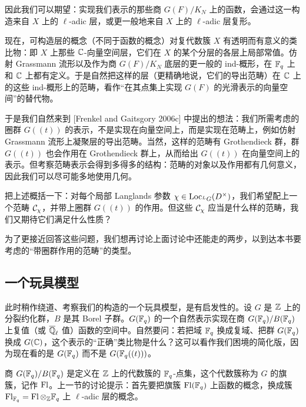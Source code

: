 因此我们可以期望：实现我们表示的那些商 $G(F)/K_N$ 上的函数，会通过这一构造来自 $X$ 上的 $\ell$-adic 层，或更一般地来自 $X$ 上的 $\ell$-adic 层复形。

现在，可构造层的概念（不同于函数的概念）对复代数簇 $X$ 有透明而有意义的类比物：即 $X$ 上那些 $\mathbb{C}$-向量空间层，它们在 $X$ 的某个分层的各层上局部常值。仿射 Grassmann 流形以及作为商 $G(F)/K_N$ 底层的更一般的 ind-概形，在 $\mathbb{F}_q$ 上和 $\mathbb{C}$ 上都有定义。于是自然把这样的层（更精确地说，它们的导出范畴）在 $\mathbb{C}$ 上的这些 ind-概形上的范畴，看作“在其点集上实现 $G(F)$ 的光滑表示的向量空间”的替代物。

于是我们自然来到 [Frenkel and Gaitsgory 2006c] 中提出的想法：我们所需考虑的圈群 $G((t))$ 的表示，不是实现在向量空间上，而是实现在范畴上，例如仿射 Grassmann 流形上凝聚层的导出范畴。当然，这样的范畴有 Grothendieck 群，群 $G((t))$ 也会作用在 Grothendieck 群上，从而给出 $G((t))$ 在向量空间上的表示。但考察范畴表示会得到多得多的结构：范畴的对象以及作用都有几何意义，因此我们可以尽可能多地使用几何。

把上述概括一下：对每个局部 Langlands 参数 $\chi\in\operatorname{Loc}_{{}^L G}(D^\times)$，我们希望配上一个范畴 $\mathcal{C}_\chi$，并带上圈群 $G((t))$ 的作用。但这些 $\mathcal{C}_\chi$ 应当是什么样的范畴，我们又期待它们满足什么性质？

为了更接近回答这些问题，我们想再讨论上面讨论中还能走的两步，以到达本书要考虑的“带圈群作用的范畴”的类型。

\subsection{一个玩具模型}

此时稍作绕道、考察我们的构造的一个玩具模型，是有启发性的。设 $G$ 是 $\mathbb{Z}$ 上的分裂约化群，$B$ 是其 Borel 子群。$G(\mathbb{F}_q)$ 的一个自然表示实现在商 $G(\mathbb{F}_q)/B(\mathbb{F}_q)$ 上复值（或 $\overline{\mathbb{Q}}_\ell$ 值）函数的空间中。自然要问：若把域 $\mathbb{F}_q$ 换成复域、把群 $G(\mathbb{F}_q)$ 换成 $G(\mathbb{C})$，这个表示的“正确”类比物是什么？这可以看作我们困境的简化版，因为现在看的是 $G(\mathbb{F}_q)$ 而不是 $G(\mathbb{F}_q((t)))$。

商 $G(\mathbb{F}_q)/B(\mathbb{F}_q)$ 是定义在 $\mathbb{Z}$ 上的代数簇的 $\mathbb{F}_q$-点集，这个代数簇称为 $G$ 的旗簇，记作 $\operatorname{Fl}$。上一节的讨论提示：首先要把旗簇 $\operatorname{Fl}(\mathbb{F}_q)$ 上函数的概念，换成簇 $\operatorname{Fl}_{\mathbb{F}_q}=\operatorname{Fl}\otimes_{\mathbb{Z}}\mathbb{F}_q$ 上 $\ell$-adic 层的概念。

